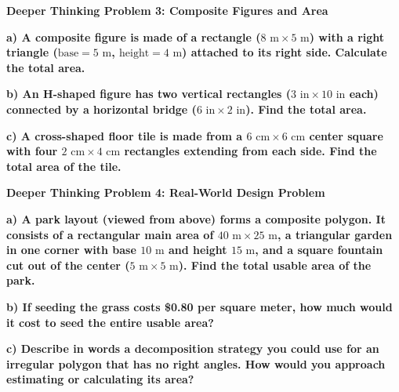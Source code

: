 \documentclass[12pt, letterpaper, fleqn]{article}
\begin{document}
\begin{tcolorbox}[colback=black!5, colframe=black!50, boxrule=1pt, arc=4mm, left=6mm, right=6mm, top=5mm, bottom=5mm]
\textbf{Deeper Thinking Problem 3: Composite Figures and Area}

\medskip

\noindent
\textbf{a) A composite figure is made of a rectangle ($8\text{ m} \times 5\text{ m}$) with a right triangle ($\text{base} = 5\text{ m}$, $\text{height} = 4\text{ m}$) attached to its right side. Calculate the total area.}

\vspace{2.5cm}

\noindent
\textbf{b) An H-shaped figure has two vertical rectangles ($3\text{ in} \times 10\text{ in}$ each) connected by a horizontal bridge ($6\text{ in} \times 2\text{ in}$). Find the total area.}

\vspace{2.5cm}

\noindent
\textbf{c) A cross-shaped floor tile is made from a $6\text{ cm} \times 6\text{ cm}$ center square with four $2\text{ cm} \times 4\text{ cm}$ rectangles extending from each side. Find the total area of the tile.}

\vspace{2cm}
\end{tcolorbox}
\newpage

\begin{tcolorbox}[colback=black!5, colframe=black!50, boxrule=1pt, arc=4mm, left=6mm, right=6mm, top=5mm, bottom=5mm]
\textbf{Deeper Thinking Problem 4: Real-World Design Problem}

\medskip

\noindent
\textbf{a) A park layout (viewed from above) forms a composite polygon. It consists of a rectangular main area of $40\text{ m} \times 25\text{ m}$, a triangular garden in one corner with base $10\text{ m}$ and height $15\text{ m}$, and a square fountain cut out of the center ($5\text{ m} \times 5\text{ m}$). Find the total usable area of the park.}

\vspace{3cm}

\noindent
\textbf{b) If seeding the grass costs \$0.80 per square meter, how much would it cost to seed the entire usable area?}

\vspace{2.5cm}

\noindent
\textbf{c) Describe in words a decomposition strategy you could use for an irregular polygon that has no right angles. How would you approach estimating or calculating its area?}

\vspace{2.5cm}
\end{tcolorbox}
\end{document}
